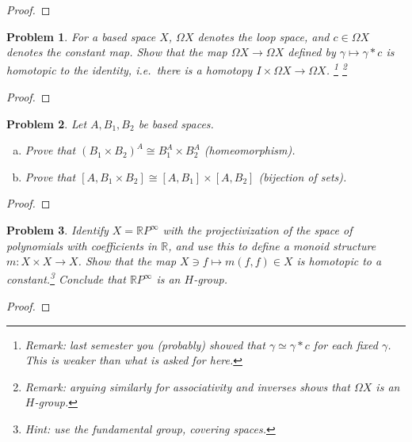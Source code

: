 \documentclass[11pt]{article}
\newtheorem{problem}{Problem}
\begin{document}
\begin{proof}

\end{proof} 


\pagebreak 

\begin{problem}For a based space $X$, $\Omega X$ denotes the loop space, and $c\in\Omega X$ denotes the constant map. Show that the map $\Omega X\rightarrow\Omega X$ defined by $\gamma\mapsto \gamma*c$ is homotopic to the identity, i.e.\ there is a homotopy $I\times \Omega X\to \Omega X$. \footnote{Remark: last semester you (probably) showed that $\gamma\simeq \gamma*c$ for each fixed $\gamma$. This is weaker than what is asked for here.}  \footnote{Remark: arguing similarly for associativity and inverses shows that $\Omega X$ is an $H$-group.} 
\end{problem}

\begin{proof}

\end{proof}

\pagebreak 

\begin{problem}
Let $A,B_1,B_2$ be based spaces. 
\begin{enumerate}[(a)]
\item Prove that $(B_1\times B_2)^A\cong B_1^A\times B_2^A$ (homeomorphism). 
\item Prove that $[A,B_1\times B_2]\cong[A,B_1]\times[A,B_2]$ (bijection of sets). 
\end{enumerate} 
\end{problem}

\begin{proof}

\end{proof}



\pagebreak 

\begin{problem}
Identify $X=\mathbb R P^\infty$ with the projectivization of the space of polynomials with coefficients in $\mathbb R$, and use this to define a monoid structure $m:X\times X\to X$. Show that the map $X\ni f\mapsto m(f,f)\in X$ is homotopic to a constant.\footnote{Hint: use the fundamental group, covering spaces.} Conclude that $\mathbb R P^\infty$ is an $H$-group. 
\end{problem}

\begin{proof}

\end{proof}
\end{document}

